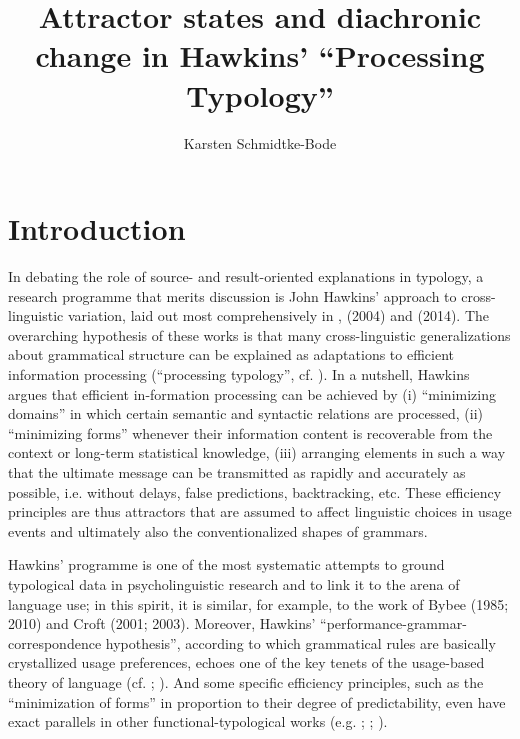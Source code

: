 \documentclass[output=paper]{langsci/langscibook}
\author{Karsten Schmidtke-Bode\affiliation{Leipzig University}}
\title{Attractor states and diachronic change in Hawkins’ “Processing Typology”}
\begin{document}
\maketitle 
 
\section{ Introduction} 

In debating the role of source- and result-oriented explanations in typology, a research programme that merits discussion is John Hawkins’ approach to cross-linguistic variation, laid out most comprehensively in \citet{Hawkins1994}, (2004) and (2014). The overarching hypothesis of these works is that many cross-linguistic generalizations about grammatical structure can be explained as adaptations to efficient information processing (“processing typology”, cf. \citealt{Hawkins2007}). In a nutshell, Hawkins argues that efficient in-formation processing can be achieved by (i) “minimizing domains” in which certain semantic and syntactic relations are processed, (ii) “minimizing forms” whenever their information content is recoverable from the context or long-term statistical knowledge, (iii) arranging elements in such a way that the ultimate message can be transmitted as rapidly and accurately as possible, i.e. without delays, false predictions, backtracking, etc. These efficiency principles are thus attractors that are assumed to affect linguistic choices in usage events and ultimately also the conventionalized shapes of grammars.

Hawkins’ programme is one of the most systematic attempts to ground typological data in psycholinguistic research and to link it to the arena of language use; in this spirit, it is similar, for example, to the work of Bybee (1985; 2010) and Croft (2001; 2003). Moreover, Hawkins’ “performance-grammar-correspondence hypothesis”, according to which grammatical rules are basically crystallized usage preferences, echoes one of the key tenets of the usage-based theory of language (cf. \citealt{Langacker1987}; \citealt{KemmerBarlow2000}). And some specific efficiency principles, such as the “minimization of forms” in proportion to their degree of predictability, even have exact parallels in other functional-typological works (e.g. \citealt{Haiman1983}; \citealt{Croft2003}; \citealt{Haspelmath2008}). 
\end{document}
